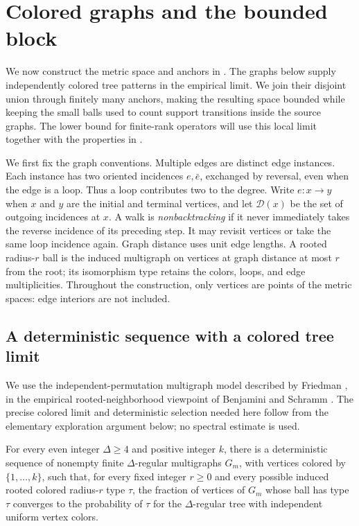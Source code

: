 \section{Colored graphs and the bounded block}
\label{sec:blocks}

We now construct the metric space and anchors in .
The graphs below supply independently colored tree patterns in the empirical
limit. We join their
disjoint union through finitely many anchors, making the resulting space
bounded while keeping the small balls used to count support transitions
inside the source graphs. The lower bound for finite-rank operators will
use this local limit together with the properties in .

We first fix the graph conventions. Multiple edges are distinct edge
instances. Each instance has two oriented incidences $e,\bar e$, exchanged
by reversal, even when the edge is a loop. Thus a loop contributes two to
the degree. Write $e:x\to y$ when $x$ and $y$ are the initial and terminal
vertices, and let $\mathcal D(x)$ be the set of outgoing incidences at $x$.
A walk is \emph{nonbacktracking} if it never immediately takes the reverse
incidence of its preceding step. It may revisit vertices or take the same
loop incidence again. Graph distance uses unit edge lengths. A rooted
radius-$r$ ball is the induced multigraph on vertices at graph distance at
most $r$ from the root; its isomorphism type retains the colors, loops, and
edge multiplicities. Throughout the construction, only vertices are points
of the metric spaces: edge interiors are not included.

\subsection{A deterministic sequence with a colored tree limit}

We use the independent-permutation multigraph model described by Friedman
\cite[\S1, p.~2]{Friedman04}, in the empirical rooted-neighborhood viewpoint
of Benjamini and Schramm \cite[\S1.2]{BenjaminiSchramm01}. The precise colored
limit and deterministic selection needed here follow from the elementary
exploration argument below; no spectral estimate is used.

\begin{lemma}\label{lem:local-limit}
For every even integer $\Delta\ge4$ and positive integer $k$, there is a
deterministic sequence of nonempty finite $\Delta$-regular multigraphs
$G_m$, with vertices colored by $\{1,\ldots,k\}$, such that, for every
fixed integer $r\ge0$ and every possible induced rooted colored
radius-$r$ type $\tau$, the fraction of vertices of $G_m$ whose ball has
type $\tau$ converges to the probability of $\tau$ for the
$\Delta$-regular tree with independent uniform vertex colors.
\end{lemma}

